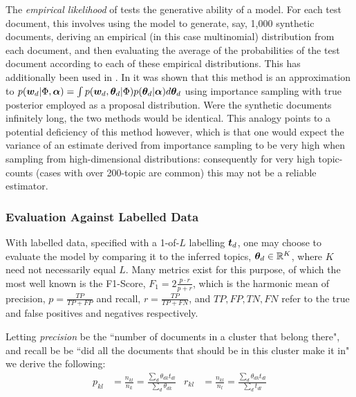 
The \emph{empirical likelihood} of \cite{Li2006} tests the generative ability of a model. For each test document, this involves using the model to generate, say, 1,000 synthetic documents, deriving an empirical (in this case multinomial) distribution from each document, and then evaluating the average of the probabilities of the test document according to each of these empirical distributions. This has additionally been used in \cite{Doyle2009}\cite{Mimno2008}. In \cite{Wallach2009} it was shown that this method is an approximation to $p(\bm w_d|\Phi, \bm \alpha) = \int p(\bm w_d, { \bm \theta_d } | \Phi)p({ \bm \theta_d }|\bm \alpha)d{ \bm \theta_d }$ using importance sampling with true posterior employed as a proposal distribution. Were the synthetic documents infinitely long, the two methods would be identical. This analogy points to a potential deficiency of this method however, which is that one would expect the variance of an estimate derived from importance sampling to be very high when sampling from high-dimensional distributions: consequently for very high topic-counts (cases with over 200-topic are common) this may not be a reliable estimator.

\subsubsection*{Evaluation Against Labelled Data}
With labelled data, specified with a 1-of-$L$ labelling $\bm t_d$, one may choose to evaluate the model by comparing it to the inferred topics, ${ \bm \theta_d } \in { \mathbb{R}^{K} }$, where $K$ need not necessarily equal $L$. Many metrics exist for this purpose, of which the most well known is the F1-Score, $F_1 = 2 \frac{p \cdot r}{p + r}$, which is the harmonic mean of precision, $p=\frac{TP}{TP+FP}$ and recall, $r=\frac{TP}{TP+FN}$, and $TP, FP, TN, FN$ refer to the true and false positives and negatives respectively.


Letting \emph{precision} be the ``number of documents in a cluster that belong there", and recall be be ``did all the documents that should be in this cluster make it in" we derive the following:
\begin{align}
p_{kl} & = \frac{n_{kl}}{n_k} = \frac{\sum_d \theta_{dk} t_{dl}}{\sum_d \theta_{dk}}  & r_{kl} & = \frac{n_{kl}}{n_l} = \frac{\sum_d \theta_{dk} t_{dl}}{\sum_d t_{dl}} \label{eqn:myrecall}
\end{align}

